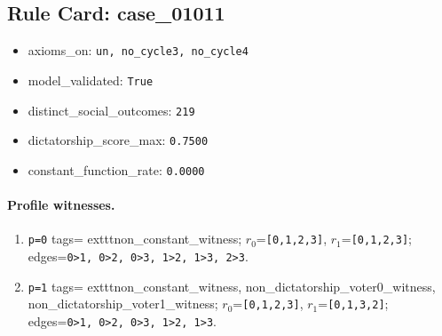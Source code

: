 \subsection*{Rule Card: case\_01011}
\begin{itemize}
\item axioms\_on: \texttt{un, no\_cycle3, no\_cycle4}
\item model\_validated: \texttt{True}
\item distinct\_social\_outcomes: \texttt{219}
\item dictatorship\_score\_max: \texttt{0.7500}
\item constant\_function\_rate: \texttt{0.0000}
\end{itemize}
\paragraph{Profile witnesses.}
\begin{enumerate}
\item \texttt{p=0} tags=	exttt{non\_constant\_witness}; $r_0$=\texttt{[0,1,2,3]}, $r_1$=\texttt{[0,1,2,3]}; edges=\texttt{0>1, 0>2, 0>3, 1>2, 1>3, 2>3}.
\item \texttt{p=1} tags=	exttt{non\_constant\_witness, non\_dictatorship\_voter0\_witness, non\_dictatorship\_voter1\_witness}; $r_0$=\texttt{[0,1,2,3]}, $r_1$=\texttt{[0,1,3,2]}; edges=\texttt{0>1, 0>2, 0>3, 1>2, 1>3}.
\end{enumerate}
